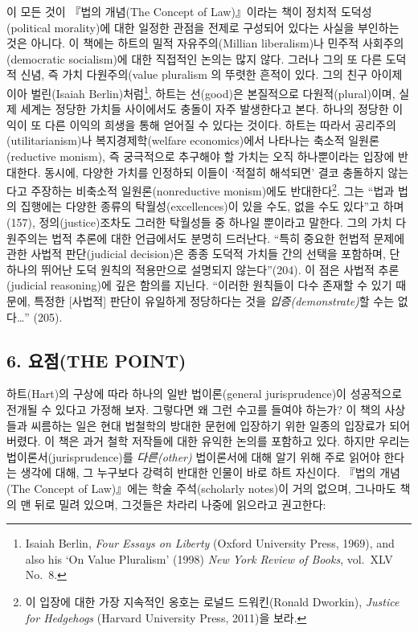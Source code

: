 \documentclass[12pt, oneside]{book}  %
\begin{document}
이 모든 것이 『법의 개념(The Concept of Law)』이라는 책이 정치적
도덕성(political morality)에 대한 일정한 관점을 전제로 구성되어 있다는
사실을 부인하는 것은 아니다. 이 책에는 하트의 밀적 자유주의(Millian
liberalism)나 민주적 사회주의(democratic socialism)에 대한 직접적인
논의는 많지 않다. 그러나 그의 또 다른 도덕적 신념, 즉 가치
다원주의(value pluralism 의 뚜렷한 흔적이 있다. 그의 친구 아이제이아
벌린(Isaiah Berlin)처럼\footnote{Isaiah Berlin, \emph{Four Essays on
  Liberty} (Oxford University Press, 1969), and also his `On Value
  Pluralism' (1998) \emph{New York Review of Books}, vol.~XLV No.~8.},
하트는 선(good)은 본질적으로 다원적(plural)이며, 실제 세계는 정당한
가치들 사이에서도 충돌이 자주 발생한다고 본다. 하나의 정당한 이익이 또
다른 이익의 희생을 통해 얻어질 수 있다는 것이다. 하트는 따라서
공리주의(utilitarianism)나 복지경제학(welfare economics)에서 나타나는
축소적 일원론(reductive monism), 즉 궁극적으로 추구해야 할 가치는 오직
하나뿐이라는 입장에 반대한다. 동시에, 다양한 가치를 인정하되 이들이
`적절히 해석되면' 결코 충돌하지 않는다고 주장하는 비축소적
일원론(nonreductive monism)에도 반대한다\footnote{이 입장에 대한 가장
  지속적인 옹호는 로널드 드워킨(Ronald Dworkin), \emph{Justice for
  Hedgehogs} (Harvard University Press, 2011)을 보라.}. 그는 ``법과 법의
집행에는 다양한 종류의 탁월성(excellences)이 있을 수도, 없을 수도
있다''고 하며(157), 정의(justice)조차도 그러한 탁월성들 중 하나일
뿐이라고 말한다. 그의 가치 다원주의는 법적 추론에 대한 언급에서도 분명히
드러난다. ``특히 중요한 헌법적 문제에 관한 사법적 판단(judicial
decision)은 종종 도덕적 가치들 간의 선택을 포함하며, 단 하나의 뛰어난
도덕 원칙의 적용만으로 설명되지 않는다''(204). 이 점은 사법적
추론(judicial reasoning)에 깊은 함의를 지닌다. ``이러한 원칙들이 다수
존재할 수 있기 때문에, 특정한 {[}사법적{]} 판단이 유일하게 정당하다는
것을 \emph{입증(demonstrate)}할 수는 없다\ldots{}'' (205).

\subsection{\texorpdfstring{\textbf{6. 요점(THE
POINT)}}{6. 요점(THE POINT)}}\label{uxc694uxc810the-point}

하트(Hart)의 구상에 따라 하나의 일반 법이론(general jurisprudence)이
성공적으로 전개될 수 있다고 가정해 보자. 그렇다면 왜 그런 수고를 들여야
하는가? 이 책의 사상들과 씨름하는 일은 현대 법철학의 방대한 문헌에
입장하기 위한 일종의 입장료가 되어버렸다. 이 책은 과거 철학 저작들에
대한 유익한 논의를 포함하고 있다. 하지만 우리는
법이론서(jurisprudence)를 \emph{다른(other)} 법이론서에 대해 알기 위해
주로 읽어야 한다는 생각에 대해, 그 누구보다 강력히 반대한 인물이 바로
하트 자신이다. 『법의 개념(The Concept of Law)』에는 학술 주석(scholarly
notes)이 거의 없으며, 그나마도 책의 맨 뒤로 밀려 있으며, 그것들은 차라리
나중에 읽으라고 권고한다:
\end{document}
